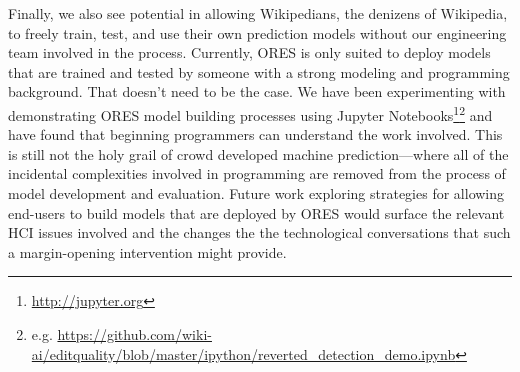 Finally, we also see potential in allowing Wikipedians, the denizens of Wikipedia, to freely train, test, and use their own prediction models without our engineering team involved in the process.  Currently, ORES is only suited to deploy models that are trained and tested by someone with a strong modeling and programming background.  That doesn't need to be the case.  We have been experimenting with demonstrating ORES model building processes using Jupyter Notebooks\footnote{\url{http://jupyter.org}}\footnote{e.g. \url{ https://github.com/wiki-ai/editquality/blob/master/ipython/reverted_detection_demo.ipynb}} and have found that beginning programmers can understand the work involved.  This is still not the holy grail of crowd developed machine prediction---where all of the incidental complexities involved in programming are removed from the process of model development and evaluation.  Future work exploring strategies for allowing end-users to build models that are deployed by ORES would surface the relevant HCI issues involved and the changes the the technological conversations that such a margin-opening intervention might provide.
